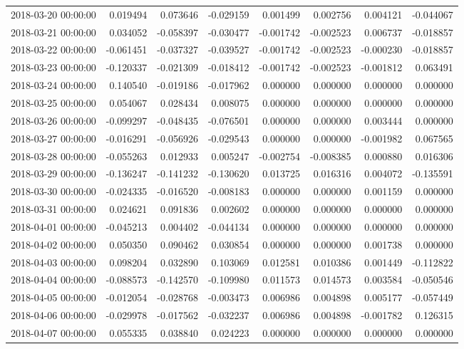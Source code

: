 \begin{tabular}{lrrrrrrr}
2018-03-20 00:00:00 & 0.019494 & 0.073646 & -0.029159 & 0.001499 & 0.002756 & 0.004121 & -0.044067 \\
2018-03-21 00:00:00 & 0.034052 & -0.058397 & -0.030477 & -0.001742 & -0.002523 & 0.006737 & -0.018857 \\
2018-03-22 00:00:00 & -0.061451 & -0.037327 & -0.039527 & -0.001742 & -0.002523 & -0.000230 & -0.018857 \\
2018-03-23 00:00:00 & -0.120337 & -0.021309 & -0.018412 & -0.001742 & -0.002523 & -0.001812 & 0.063491 \\
2018-03-24 00:00:00 & 0.140540 & -0.019186 & -0.017962 & 0.000000 & 0.000000 & 0.000000 & 0.000000 \\
2018-03-25 00:00:00 & 0.054067 & 0.028434 & 0.008075 & 0.000000 & 0.000000 & 0.000000 & 0.000000 \\
2018-03-26 00:00:00 & -0.099297 & -0.048435 & -0.076501 & 0.000000 & 0.000000 & 0.003444 & 0.000000 \\
2018-03-27 00:00:00 & -0.016291 & -0.056926 & -0.029543 & 0.000000 & 0.000000 & -0.001982 & 0.067565 \\
2018-03-28 00:00:00 & -0.055263 & 0.012933 & 0.005247 & -0.002754 & -0.008385 & 0.000880 & 0.016306 \\
2018-03-29 00:00:00 & -0.136247 & -0.141232 & -0.130620 & 0.013725 & 0.016316 & 0.004072 & -0.135591 \\
2018-03-30 00:00:00 & -0.024335 & -0.016520 & -0.008183 & 0.000000 & 0.000000 & 0.001159 & 0.000000 \\
2018-03-31 00:00:00 & 0.024621 & 0.091836 & 0.002602 & 0.000000 & 0.000000 & 0.000000 & 0.000000 \\
2018-04-01 00:00:00 & -0.045213 & 0.004402 & -0.044134 & 0.000000 & 0.000000 & 0.000000 & 0.000000 \\
2018-04-02 00:00:00 & 0.050350 & 0.090462 & 0.030854 & 0.000000 & 0.000000 & 0.001738 & 0.000000 \\
2018-04-03 00:00:00 & 0.098204 & 0.032890 & 0.103069 & 0.012581 & 0.010386 & 0.001449 & -0.112822 \\
2018-04-04 00:00:00 & -0.088573 & -0.142570 & -0.109980 & 0.011573 & 0.014573 & 0.003584 & -0.050546 \\
2018-04-05 00:00:00 & -0.012054 & -0.028768 & -0.003473 & 0.006986 & 0.004898 & 0.005177 & -0.057449 \\
2018-04-06 00:00:00 & -0.029978 & -0.017562 & -0.032237 & 0.006986 & 0.004898 & -0.001782 & 0.126315 \\
2018-04-07 00:00:00 & 0.055335 & 0.038840 & 0.024223 & 0.000000 & 0.000000 & 0.000000 & 0.000000 \\

\end{tabular}
